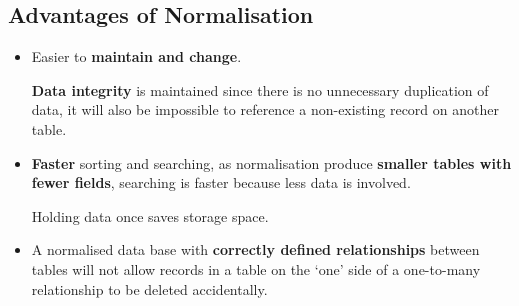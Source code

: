 \subsection*{Advantages of Normalisation}

\begin{itemize}
    \item Easier to \textbf{maintain and change}.

        \textbf{Data integrity} is maintained since there is no unnecessary duplication of data, it will also be impossible to reference a non-existing record on another table.

    \item \textbf{Faster} sorting and searching, as normalisation produce \textbf{smaller tables with fewer fields}, searching is faster because less data is involved.

        Holding data once saves storage space.

    \item A normalised data base with \textbf{correctly defined relationships} between tables will not allow records in a table on the `one' side of a one-to-many relationship to be deleted accidentally.
\end{itemize}
